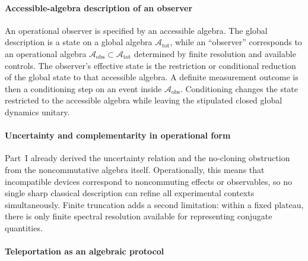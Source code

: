 \documentclass[12pt,a4paper]{article}
\begin{document}
\paragraph{Accessible-algebra description of an observer}
\label{p4:sec:part2-observer}

An operational observer is specified by an accessible algebra.
The global description is a state on a global algebra $\mathcal A_{\mathrm{tot}}$, while an ``observer'' corresponds to an operational algebra $\mathcal A_{\mathrm{obs}}\subset \mathcal A_{\mathrm{tot}}$ determined by finite resolution and available controls.
The observer's effective state is the restriction or conditional reduction of the global state to that accessible algebra.
A definite measurement outcome is then a conditioning step on an event inside $\mathcal A_{\mathrm{obs}}$.
Conditioning changes the state restricted to the accessible algebra while leaving the stipulated closed global dynamics unitary.



\paragraph{Uncertainty and complementarity in operational form}
\label{p4:sec:part2-uncertainty-op}

Part~I already derived the uncertainty relation and the no-cloning obstruction from the noncommutative algebra itself.
Operationally, this means that incompatible devices correspond to noncommuting effects or observables, so no single sharp classical description can refine all experimental contexts simultaneously.
Finite truncation adds a second limitation: within a fixed plateau, there is only finite spectral resolution available for representing conjugate quantities.



\paragraph{Teleportation as an algebraic protocol}
\label{p4:sec:part2-teleportation}
\end{document}
